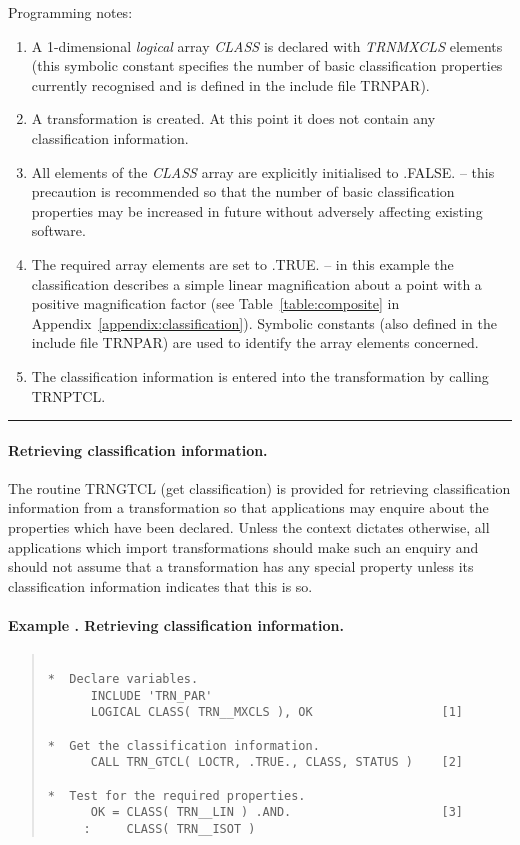 \documentclass[twoside,11pt]{article}
\renewcommand{\_}{\texttt{\symbol{95}}}
\newcommand{\name}[1]{\mbox{\small{#1}}}
\newcommand{\fortvar}[1]{\mbox{\emph{#1}}}
\newcounter{examplecounter}
\newcommand{\example}[1]{\addtocounter{examplecounter}{1}
                         \paragraph{\textbf{Example \theexamplecounter. #1}}}
\newcommand{\exampledone}[0]{\begin{center} \rule{6em}{0.2mm} \end{center}}
\begin{document}
Programming notes:

\begin{enumerate}

\item A 1-dimensional {\em logical} array \fortvar{CLASS} is declared with
\fortvar{TRN\_\_MXCLS} elements (this symbolic constant specifies the number
of basic classification properties currently recognised and is defined in
the include file \name{TRN\_PAR}).

\item A transformation is created.
At this point it does not contain any classification information.

\item All elements of the \fortvar{CLASS} array are explicitly initialised
to \name{.FALSE.} -- this precaution is recommended so that the number of
basic classification properties may be increased in future without adversely
affecting existing software.

\item The required array elements are set to \name{.TRUE.} -- in this
example the classification describes a simple linear magnification about a
point with a positive magnification factor (see Table~\ref{table:composite}
in Appendix~\ref{appendix:classification}).
Symbolic constants (also defined in the include file \name{TRN\_PAR}) are
used to identify the array elements concerned.

\item The classification information is entered into the transformation by
calling \name{TRN\_PTCL}.

\end{enumerate}
\exampledone

\paragraph{Retrieving classification information.}
The routine \name{TRN\_GTCL} (get classification) is provided for retrieving
classification information from a transformation so that applications may
enquire about the properties which have been declared.
Unless the context dictates otherwise, all applications which import
transformations should make such an enquiry and should not assume that a
transformation has any special property unless its classification
information indicates that this is so.

\example{Retrieving classification information.}

\begin{quote}
\begin{verbatim}

*  Declare variables.
      INCLUDE 'TRN_PAR'
      LOGICAL CLASS( TRN__MXCLS ), OK                  [1]

*  Get the classification information.
      CALL TRN_GTCL( LOCTR, .TRUE., CLASS, STATUS )    [2]

*  Test for the required properties.
      OK = CLASS( TRN__LIN ) .AND.                     [3]
     :     CLASS( TRN__ISOT )

\end{verbatim}
\end{quote}
\end{document}
